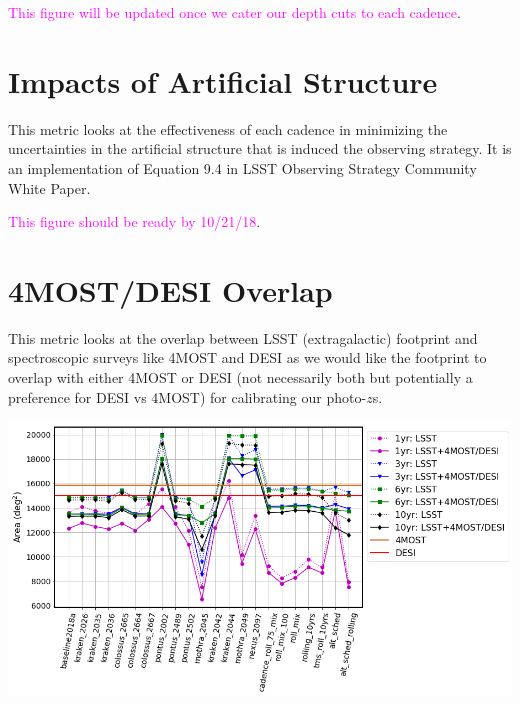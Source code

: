 \documentclass[a4paper,10pt]{article}
\newcommand{\cl}[1]{\textcolor{magenta}{#1}}
\begin{document}
\cl{This figure will be updated once we cater our depth cuts to each cadence}.

\newpage 
\section*{Impacts of Artificial Structure\label{OS systematics}}
This metric looks at the effectiveness of each cadence in minimizing the uncertainties in the artificial structure that is induced the observing strategy. It is an implementation of Equation 9.4 in LSST Observing Strategy Community White Paper.

\cl{This figure should be ready by 10/21/18}.

\begin{minipage}{\columnwidth}
\vspace*{2em}
\centering
\vspace*{2em}
\end{minipage}

\newpage
\section*{4MOST/DESI Overlap\label{4MOST+DESI overlap}}
This metric looks at the overlap between LSST (extragalactic) footprint and spectroscopic surveys like 4MOST and DESI as we would like the footprint to overlap with either 4MOST or DESI (not necessarily both but potentially a preference for DESI vs 4MOST) for calibrating our photo-$z$s.

\begin{minipage}{\columnwidth}
\vspace*{2em}
\centering
 \includegraphics[width=.8\columnwidth]{lss_compare_LSST+4MOSTorDESI_overlap_22dbs.png}
\vspace*{2em}
\end{minipage}
\end{document}
